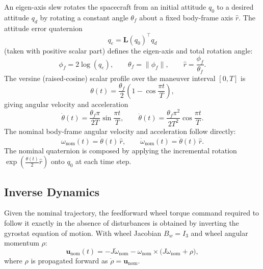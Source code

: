 An eigen-axis slew rotates the spacecraft from an initial attitude $q_0$ to a
desired attitude $q_d$ by rotating a constant angle $\theta_f$ about a fixed
body-frame axis $\hat{r}$.  The attitude error quaternion
\begin{equation}
    q_e = \mathbf{L}(q_0)^\top q_d
\end{equation}
(taken with positive scalar part) defines the eigen-axis and total rotation angle:
\begin{equation}
    {\phi}_f = 2\log(q_e),
    \qquad
    \theta_f = \|{\phi}_f\|,
    \qquad
    \hat{r} = \frac{{\phi}_f}{\theta_f}.
\end{equation}
The versine (raised-cosine) scalar profile over the maneuver interval $[0, T]$ is
\begin{equation}
\label{eq:versine}
    \theta(t) = \frac{\theta_f}{2}\!\left(1 - \cos\frac{\pi t}{T}\right),
\end{equation}
giving angular velocity and acceleration
\begin{equation}
    \dot\theta(t) = \frac{\theta_f\pi}{2T}\sin\frac{\pi t}{T},
    \qquad
    \ddot\theta(t) = \frac{\theta_f\pi^2}{2T^2}\cos\frac{\pi t}{T}.
\end{equation}
The nominal body-frame angular velocity and acceleration follow directly:
\begin{equation}
    {\omega}_{\mathrm{nom}}(t) = \dot\theta(t)\,\hat{r},
    \qquad
    \dot{{\omega}}_{\mathrm{nom}}(t) = \ddot\theta(t)\,\hat{r}.
\end{equation}
The nominal quaternion is composed by applying the incremental rotation
$\exp(\frac{\theta(t)}{2}\hat{r})$ onto $q_0$ at each time step.

\subsection{Inverse Dynamics}
\label{subsec:slew_invdyn}

Given the nominal trajectory, the feedforward wheel torque command required to
follow it exactly in the absence of disturbances is obtained by inverting the
gyrostat equation of motion.  With wheel Jacobian $B_w = I_3$ and wheel
angular momentum ${\rho}$:
\begin{equation}
\label{eq:invdyn}
    \mathbf{u}_{\mathrm{nom}}(t)
    = -J\dot{{\omega}}_{\mathrm{nom}}
      - {\omega}_{\mathrm{nom}} \times
        \bigl(J{\omega}_{\mathrm{nom}} + {\rho}\bigr),
\end{equation}
where ${\rho}$ is propagated forward as $\dot{{\rho}} = \mathbf{u}_{\mathrm{nom}}$.

